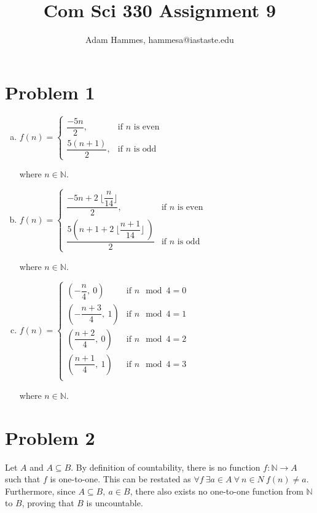 \documentclass[11pt]{article}
\begin{document}
\let\iff\leftrightarrow

\title{Com Sci 330 Assignment 9}
\author{Adam Hammes, hammesa@iastaste.edu}
\maketitle

\section*{Problem 1}
	\begin{enumerate}[(a)]
	\item 
		$f(n) = \begin{cases}
			\dfrac{-5n}{2}, &\text{if } n \text{ is even}\\[2ex]
			\dfrac{5(n+1)}{2}, &\text{if } n \text{ is odd}
			\end{cases}$
			
		where $n \in \mathbb{N}$.
		
	\item 
	
		$f(n) = \begin{cases}
		\dfrac{-5n+ 2\ \lfloor{ \dfrac{n}{14}}\rfloor}{2}, &\text{if } n \text{ is even}\\[2ex]
		
		\dfrac{5(n+1+2\ \lfloor{ \dfrac{n+1}{14} } \rfloor\ )}{2}      &\text{if } n \text{ is odd}
		\end{cases}$
		
		where $n \in \mathbb{N}$.
	
	\item
		$f(n) = \begin{cases}

			\left(-\dfrac{n}{4},\ 0\right) &\text{if } n \mod 4 = 0\\[2ex]
			\left(-\dfrac{n+3}{4},\ 1\right) &\text{if } n \mod 4 = 1\\[2ex] 
			\left(\dfrac{n+2}{4},\ 0\right) &\text{if } n \mod 4 = 2\\[2ex]
			\left(\dfrac{n+1}{4},\ 1\right) &\text{if } n \mod 4 = 3\\
			\end{cases}$

		where $n \in \mathbb{N}$.
	\end{enumerate}
	
\section*{Problem 2}
	Let $A$ and $A \subseteq B$. By definition of countability, there is no function $f: \mathbb{N} \rightarrow A$ such that $f$
	is one-to-one. This can be restated as $\forall f\ \exists a \in A\ \forall\ n \in N\ f(n) \neq a$. Furthermore, since $A \subseteq B,
	\ a \in B$, there also exists no one-to-one function from $\mathbb{N}$ to $B$, proving that $B$ is uncountable.
	
\end{document}
